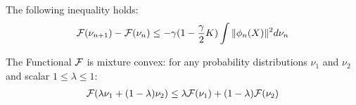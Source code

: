 \begin{lemma}\label{lem:decreasing_functional}
	The following inequality holds:
	\begin{align}
		{{\mathcal F}}(\nu_{n+1})-{{\mathcal F}}(\nu_n)\leq -\gamma (1-\frac{\gamma}{2}K )\int \Vert \phi_n(X)\Vert^2 d\nu_n
	\end{align}
\end{lemma}


\begin{lemma}\label{lem:mixture_convexity}
The Functional ${{\mathcal F}}$ is mixture convex: for any probability distributions $\nu_1$ and $\nu_2$ and scalar $1\leq \lambda\leq 1$:
\begin{align}
	{{\mathcal F}}(\lambda \nu_1+(1-\lambda)\nu_2)\leq \lambda {{\mathcal F}}(\nu_1)+ (1-\lambda){{\mathcal F}}(\nu_2)
\end{align}
\end{lemma}